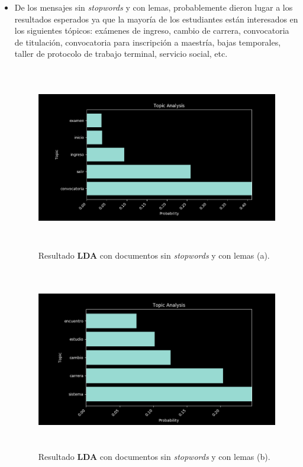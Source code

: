 \begin{itemize}
        \item De los mensajes sin \textit{stopwords} y con lemas, probablemente dieron lugar a los resultados esperados ya que la mayoría de los estudiantes están interesados en los siguientes tópicos: exámenes de ingreso, cambio de carrera, convocatoria de titulación, convocatoria para inscripción a maestría, bajas temporales, taller de protocolo de trabajo terminal, servicio social, etc.
        \begin{figure}[H]
            \centering
            \includegraphics[height=8cm, width=16.5cm]{Latex/Classes/Imagenes/ns_wl-1.png}
            \caption{Resultado \textbf{LDA} con documentos sin \textit{stopwords} y con lemas (a).}
            \label{fig:ns_wl-1}
        \end{figure}
        \begin{figure}[H]
            \centering
            \includegraphics[height=8cm, width=16.5cm]{Latex/Classes/Imagenes/ns_wl-2.png}
            \caption{Resultado \textbf{LDA} con documentos sin \textit{stopwords} y con lemas (b).}

\end{figure}
\end{itemize}
